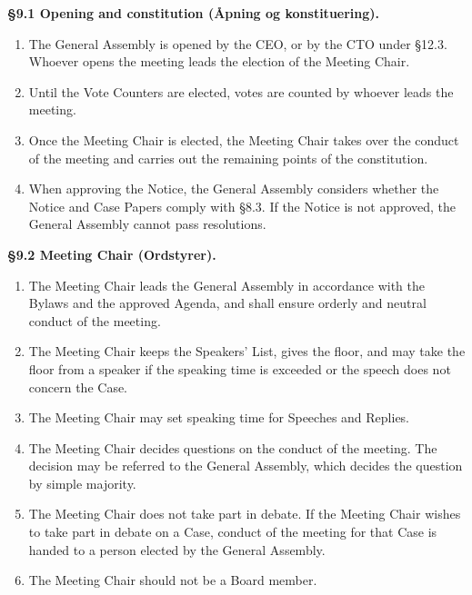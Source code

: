 \documentclass{../../../Common/Latex/Templates/rapport}
\begin{document}
\label{bylaw:9}
\textbf{\S 9.1 Opening and constitution (Åpning og konstituering).}\label{bylaw:9.1}
\begin{enumerate}
  \item The General Assembly is opened by the CEO, or by the CTO under \S12.3. Whoever opens the meeting leads the election of the Meeting Chair.
  \item Until the Vote Counters are elected, votes are counted by whoever leads the meeting.
  \item Once the Meeting Chair is elected, the Meeting Chair takes over the conduct of the meeting and carries out the remaining points of the constitution.
  \item When approving the Notice, the General Assembly considers whether the Notice and Case Papers comply with \S8.3. If the Notice is not approved, the General Assembly cannot pass resolutions.
\end{enumerate}

\textbf{\S 9.2 Meeting Chair (Ordstyrer).}\label{bylaw:9.2}
\begin{enumerate}
  \item The Meeting Chair leads the General Assembly in accordance with the Bylaws and the approved Agenda, and shall ensure orderly and neutral conduct of the meeting.
  \item The Meeting Chair keeps the Speakers' List, gives the floor, and may take the floor from a speaker if the speaking time is exceeded or the speech does not concern the Case.
  \item The Meeting Chair may set speaking time for Speeches and Replies.
  \item The Meeting Chair decides questions on the conduct of the meeting. The decision may be referred to the General Assembly, which decides the question by simple majority.
  \item The Meeting Chair does not take part in debate. If the Meeting Chair wishes to take part in debate on a Case, conduct of the meeting for that Case is handed to a person elected by the General Assembly.
  \item The Meeting Chair should not be a Board member.
\end{enumerate}
\end{document}
